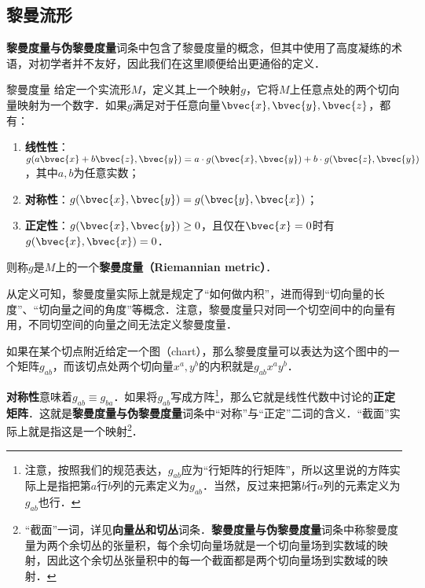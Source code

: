 

\subsection{黎曼流形}

\textbf{黎曼度量与伪黎曼度量}词条中包含了黎曼度量的概念，但其中使用了高度凝练的术语，对初学者并不友好，因此我们在这里顺便给出更通俗的定义．

\begin{definition}{黎曼度量}
给定一个实流形$M$，定义其上一个映射$g$，它将$M$上任意点处的两个切向量映射为一个数字．如果$g$满足对于任意向量$\bvec{x}, \bvec{y}, \bvec{z}$，都有：
\begin{enumerate}
\item \textbf{线性性}：$g(a\bvec{x}+b\bvec{z}, \bvec{y})=a\cdot g(\bvec{x}, \bvec{y})+b\cdot g(\bvec{z}, \bvec{y})$，其中$a, b$为任意实数；
\item \textbf{对称性}：$g(\bvec{x}, \bvec{y})=g(\bvec{y}, \bvec{x})$；
\item \textbf{正定性}：$g(\bvec{x}, \bvec{y})\geq 0$，且仅在$\bvec{x}=0$时有$g(\bvec{x}, \bvec{x})=0$．
\end{enumerate}
则称$g$是$M$上的一个\textbf{黎曼度量（Riemannian metric）}．
\end{definition}

从定义可知，黎曼度量实际上就是规定了“如何做内积”，进而得到“切向量的长度”、“切向量之间的角度”等概念．注意，黎曼度量只对同一个切空间中的向量有用，不同切空间的向量之间无法定义黎曼度量．

如果在某个切点附近给定一个图（chart），那么黎曼度量可以表达为这个图中的一个矩阵$g_{ab}$，而该切点处两个切向量${x}^a, {y}^b$的内积就是$g_{ab}{x}^a{y}^b$．

\textbf{对称性}意味着$g_{ab}\equiv g_{ba}$．如果将$g_{ab}$写成方阵\footnote{注意，按照我们的规范表达，$g_{ab}$应为“行矩阵的行矩阵”，所以这里说的方阵实际上是指把第$a$行$b$列的元素定义为$g_{ab}$．当然，反过来把第$b$行$a$列的元素定义为$g_{ab}$也行．}，那么它就是线性代数中讨论的\textbf{正定矩阵}．这就是\textbf{黎曼度量与伪黎曼度量}词条中“对称”与“正定”二词的含义．“截面”实际上就是指这是一个映射\footnote{“截面”一词，详见\textbf{向量丛和切丛}词条．\textbf{黎曼度量与伪黎曼度量}词条中称黎曼度量为两个余切丛的张量积，每个余切向量场就是一个切向量场到实数域的映射，因此这个余切丛张量积中的每一个截面都是两个切向量场到实数域的映射．}．


